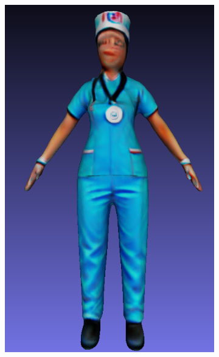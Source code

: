 \begin{figure}[H]
\begin{subfigure}[b]{0.13\textwidth}
        \caption{}
    \end{subfigure}
    \begin{subfigure}[b]{0.188\textwidth}
        \centering
        \includegraphics[width=\textwidth]{etc/bias/bias_nurse_genie_2.png}
        \caption{}
    \end{subfigure}
    \begin{subfigure}[b]{0.26\textwidth}
        \centering

\end{subfigure}
\end{figure}
